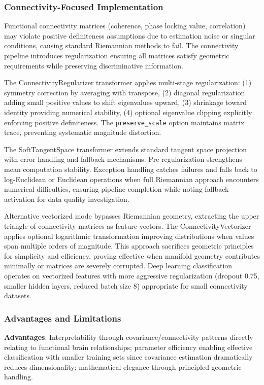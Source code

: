 \documentclass[12pt]{report}
\begin{document}
\subsubsection{Connectivity-Focused Implementation}

Functional connectivity matrices (coherence, phase locking value, correlation) may violate positive definiteness assumptions due to estimation noise or singular conditions, causing standard Riemannian methods to fail. The connectivity pipeline introduces regularization ensuring all matrices satisfy geometric requirements while preserving discriminative information.

The ConnectivityRegularizer transformer applies multi-stage regularization: (1) symmetry correction by averaging with transpose, (2) diagonal regularization adding small positive values to shift eigenvalues upward, (3) shrinkage toward identity providing numerical stability, (4) optional eigenvalue clipping explicitly enforcing positive definiteness. The \verb|preserve_scale| option maintains matrix trace, preventing systematic magnitude distortion.

The SoftTangentSpace transformer extends standard tangent space projection with error handling and fallback mechanisms. Pre-regularization strengthens mean computation stability. Exception handling catches failures and falls back to log-Euclidean or Euclidean operations when full Riemannian approach encounters numerical difficulties, ensuring pipeline completion while noting fallback activation for data quality investigation.

Alternative vectorized mode bypasses Riemannian geometry, extracting the upper triangle of connectivity matrices as feature vectors. The ConnectivityVectorizer applies optional logarithmic transformation improving distributions when values span multiple orders of magnitude. This approach sacrifices geometric principles for simplicity and efficiency, proving effective when manifold geometry contributes minimally or matrices are severely corrupted. Deep learning classification operates on vectorized features with more aggressive regularization (dropout 0.75, smaller hidden layers, reduced batch size 8) appropriate for small connectivity datasets.

\subsubsection{Advantages and Limitations}

\textbf{Advantages}: Interpretability through covariance/connectivity patterns directly relating to functional brain relationships; parameter efficiency enabling effective classification with smaller training sets since covariance estimation dramatically reduces dimensionality; mathematical elegance through principled geometric handling.
\end{document}
